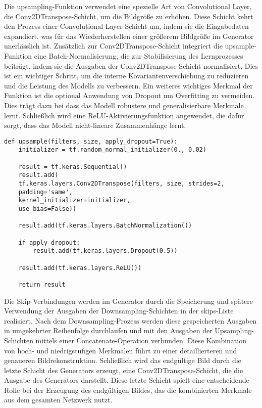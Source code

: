 Die upsampling-Funktion verwendet eine spezielle Art von Convolutional Layer, die Conv2DTranspose-Schicht, um die Bildgröße zu erhöhen. Diese Schicht kehrt den Prozess einer Convolutional Layer Schicht um, indem sie die Eingabedaten expandiert, was für das Wiederherstellen einer größerem Bildgröße im Generator unerlässlich ist. Zusätzlich zur Conv2DTranspose-Schicht integriert die upsample-Funktion eine Batch-Normalisierung, die zur Stabilisierung des Lernprozesses beiträgt, indem sie die Ausgaben der Conv2DTranspose-Schicht normalisiert. Dies ist ein wichtiger Schritt, um die interne Kovariantenverschiebung zu reduzieren und die Leistung des Modells zu verbessern. Ein weiteres wichtiges Merkmal der Funktion ist die optional Anwendung von Dropout um Overfitting zu vermeiden. Dies trägt dazu bei dass das Modell robustere und generalisierbare Merkmale lernt. Schließlich wird eine ReLU-Aktivierungsfunktion angewendet, die dafür sorgt, dass das Modell nicht-lineare Zusammenhänge lernt. 
\newpage
\begin{lstlisting}[language=pyhaff, caption={Upsampling-Schritt}, label={cod:Pix2PixGAN Generator}]
	def upsample(filters, size, apply_dropout=True):
	initializer = tf.random_normal_initializer(0., 0.02)
	
	result = tf.keras.Sequential()
	result.add(
	tf.keras.layers.Conv2DTranspose(filters, size, strides=2,
	padding='same',
	kernel_initializer=initializer,
	use_bias=False))
	
	result.add(tf.keras.layers.BatchNormalization())
	
	if apply_dropout:
		result.add(tf.keras.layers.Dropout(0.5))
	
	result.add(tf.keras.layers.ReLU())
	
	return result
\end{lstlisting} 
Die Skip-Verbindungen werden im Generator durch die Speicherung und spätere Verwendung der Ausgaben der Downsampling-Schichten in der skips-Liste realisiert. Nach dem Downsampling-Prozess werden diese gespeicherten Ausgaben in umgekehrter Reihenfolge durchlaufen und mit den Ausgaben der Upsampling-Schichten mittels einer Concatenate-Operation verbunden. Diese Kombination von hoch- und niedrigstufigen Merkmalen führt zu einer detaillierteren und genaueren Bildrekonstruktion.
\newline
Schließlich wird das endgültige Bild durch die letzte Schicht des Generators erzeugt, eine Conv2DTranspose-Schicht, die die Ausgabe des Generators darstellt. Diese letzte Schicht spielt eine entscheidende Rolle bei der Erzeugung des endgültigen Bildes, das die kombinierten Merkmale aus dem gesamten Netzwerk nutzt.
